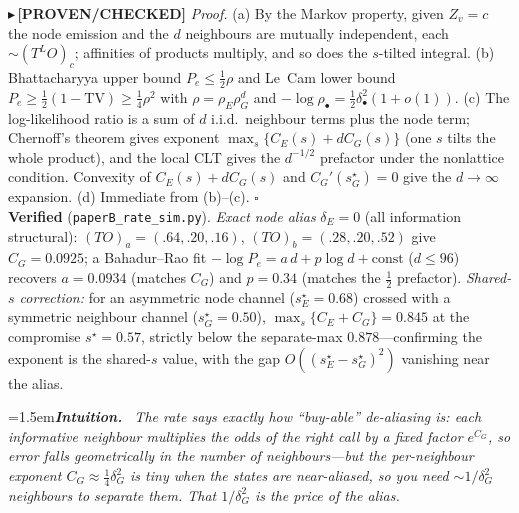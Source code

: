\documentclass[11pt]{article}
\newcommand{\PROVEN}[1]{{\color{teal}\small$\blacktriangleright$\,\textbf{[PROVEN/CHECKED]} #1}}
\newenvironment{intuition}{\par\smallskip\noindent\hangindent=1.5em\textbf{\itshape Intuition.}\itshape\ \ignorespaces}{\par\smallskip}
\begin{document}
\PROVEN{\emph{Proof.} (a) By the Markov property, given $Z_v=c$ the node emission and the $d$ neighbours are
mutually independent, each $\sim(T^{L}O)_c$; affinities of products multiply, and so does the $s$-tilted
integral. (b) Bhattacharyya upper bound $P_e\le\tfrac12\rho$ and Le~Cam lower bound
$P_e\ge\tfrac12(1-\mathrm{TV})\ge\tfrac14\rho^{2}$ with $\rho=\rho_E\rho_G^{d}$ and
$-\log\rho_\bullet=\tfrac12\delta_\bullet^2(1+o(1))$. (c) The log-likelihood ratio is a sum of $d$ i.i.d.\ neighbour
terms plus the node term; Chernoff's theorem gives exponent $\max_s\{C_E(s)+dC_G(s)\}$ (one $s$ tilts the whole
product), and the local CLT gives the $d^{-1/2}$ prefactor under the nonlattice condition. Convexity of $C_E(s)+
dC_G(s)$ and $C_G'(s_G^\star)=0$ give the $d\to\infty$ expansion. (d) Immediate from (b)--(c). \hfill$\square$\\[2pt]
\textbf{Verified} (\texttt{paperB\_rate\_sim.py}). \emph{Exact node alias} $\delta_E{=}0$ (all information
structural): $(T\!O)_a{=}(.64,.20,.16)$, $(T\!O)_b{=}(.28,.20,.52)$ give $C_G{=}0.0925$; a Bahadur--Rao fit
$-\log P_e=a\,d+p\log d+\text{const}$ ($d\le96$) recovers $a=0.0934$ (matches $C_G$) and $p=0.34$ (matches the
$\tfrac12$ prefactor). \emph{Shared-$s$ correction:} for an asymmetric node channel ($s_E^\star{=}0.68$) crossed
with a symmetric neighbour channel ($s_G^\star{=}0.50$), $\max_s\{C_E{+}C_G\}=0.845$ at the compromise
$s^\star{=}0.57$, strictly below the separate-max $0.878$---confirming the exponent is the shared-$s$ value, with
the gap $O((s_E^\star-s_G^\star)^2)$ vanishing near the alias.}
\begin{intuition}
The rate says exactly how ``buy-able'' de-aliasing is: each informative neighbour multiplies the odds of the
right call by a fixed factor $e^{C_G}$, so error falls geometrically in the number of neighbours---but the
per-neighbour exponent $C_G\approx\tfrac14\delta_G^2$ is tiny when the states are near-aliased, so you need
$\sim 1/\delta_G^2$ neighbours to separate them. That $1/\delta_G^2$ is the price of the alias.
\end{intuition}
\end{document}
